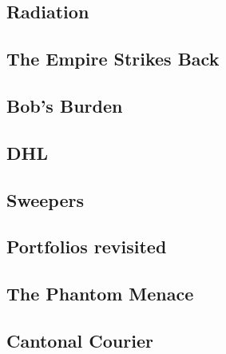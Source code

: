 \documentclass[10pt,a4paper,twoside]{report}
\begin{document}
\newpage
\subsection*{Radiation}
\begin{keywords}\end{keywords}


\newpage
\subsection*{The Empire Strikes Back}
\begin{keywords}\end{keywords}



\newpage
\subsection*{Bob's Burden}
\begin{keywords}\end{keywords}


\newpage
\subsection*{DHL}
\begin{keywords}\end{keywords}


\newpage
\subsection*{Sweepers}
\begin{keywords}\end{keywords}


\newpage
\subsection*{Portfolios revisited}
\begin{keywords}\end{keywords}


\newpage
\subsection*{The Phantom Menace}
\begin{keywords}\end{keywords}



\newpage
\subsection*{Cantonal Courier}
\begin{keywords}\end{keywords}



\printindex
\end{document}

